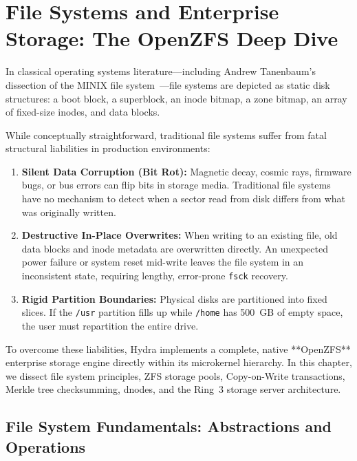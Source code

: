 \chapter{File Systems and Enterprise Storage: The OpenZFS Deep Dive}
\label{chap:zfs}

In classical operating systems literature---including Andrew Tanenbaum's dissection of the MINIX file system~\cite{tanenbaum2006operating}---file systems are depicted as static disk structures: a boot block, a superblock, an inode bitmap, a zone bitmap, an array of fixed-size inodes, and data blocks.

While conceptually straightforward, traditional file systems suffer from fatal structural liabilities in production environments:
\begin{enumerate}
    \item \textbf{Silent Data Corruption (Bit Rot):} Magnetic decay, cosmic rays, firmware bugs, or bus errors can flip bits in storage media. Traditional file systems have no mechanism to detect when a sector read from disk differs from what was originally written.
    \item \textbf{Destructive In-Place Overwrites:} When writing to an existing file, old data blocks and inode metadata are overwritten directly. An unexpected power failure or system reset mid-write leaves the file system in an inconsistent state, requiring lengthy, error-prone \texttt{fsck} recovery.
    \item \textbf{Rigid Partition Boundaries:} Physical disks are partitioned into fixed slices. If the \texttt{/usr} partition fills up while \texttt{/home} has 500~GB of empty space, the user must repartition the entire drive.
\end{enumerate}

To overcome these liabilities, Hydra implements a complete, native **OpenZFS** enterprise storage engine directly within its microkernel hierarchy. In this chapter, we dissect file system principles, ZFS storage pools, Copy-on-Write transactions, Merkle tree checksumming, dnodes, and the Ring~3 storage server architecture.

\section{File System Fundamentals: Abstractions and Operations}
\label{sec:fs_fundamentals}

